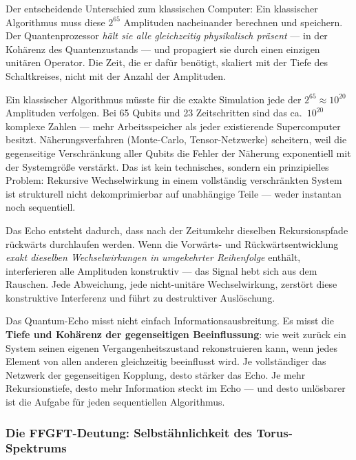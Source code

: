 Der entscheidende Unterschied zum klassischen Computer:
Ein klassischer Algorithmus muss diese $2^{65}$ Amplituden nacheinander berechnen
und speichern. Der Quantenprozessor \emph{hält sie alle gleichzeitig physikalisch
präsent} — in der Kohärenz des Quantenzustands — und propagiert sie durch einen
einzigen unitären Operator. Die Zeit, die er dafür benötigt, skaliert mit der
Tiefe des Schaltkreises, nicht mit der Anzahl der Amplituden.

\begin{technical}
Ein klassischer Algorithmus müsste für die exakte Simulation jede der $2^{65}
\approx 10^{20}$ Amplituden verfolgen. Bei 65 Qubits und 23 Zeitschritten
sind das ca.\ $10^{20}$ komplexe Zahlen — mehr Arbeitsspeicher als jeder
existierende Supercomputer besitzt. Näherungsverfahren (Monte-Carlo,
Tensor-Netzwerke) scheitern, weil die gegenseitige Verschränkung aller Qubits
die Fehler der Näherung exponentiell mit der Systemgröße verstärkt.
Das ist kein technisches, sondern ein prinzipielles Problem: Rekursive
Wechselwirkung in einem vollständig verschränkten System ist strukturell
nicht dekomprimierbar auf unabhängige Teile — weder instantan noch sequentiell.
\end{technical}

Das Echo entsteht dadurch, dass nach der Zeitumkehr dieselben Rekursionspfade
rückwärts durchlaufen werden. Wenn die Vorwärts- und Rückwärtsentwicklung
\emph{exakt dieselben Wechselwirkungen in umgekehrter Reihenfolge} enthält,
interferieren alle Amplituden konstruktiv — das Signal hebt sich aus dem Rauschen.
Jede Abweichung, jede nicht-unitäre Wechselwirkung, zerstört diese konstruktive
Interferenz und führt zu destruktiver Auslöschung.

\begin{keypoint}
Das Quantum-Echo misst nicht einfach Informationsausbreitung. Es misst die
\textbf{Tiefe und Kohärenz der gegenseitigen Beeinflussung}: wie weit zurück
ein System seinen eigenen Vergangenheitszustand rekonstruieren kann, wenn jedes
Element von allen anderen gleichzeitig beeinflusst wird.
Je vollständiger das Netzwerk der gegenseitigen Kopplung, desto stärker das Echo.
Je mehr Rekursionstiefe, desto mehr Information steckt im Echo — und desto
unlösbarer ist die Aufgabe für jeden sequentiellen Algorithmus.
\end{keypoint}

\subsubsection*{Die FFGFT-Deutung: Selbstähnlichkeit des Torus-Spektrums}

